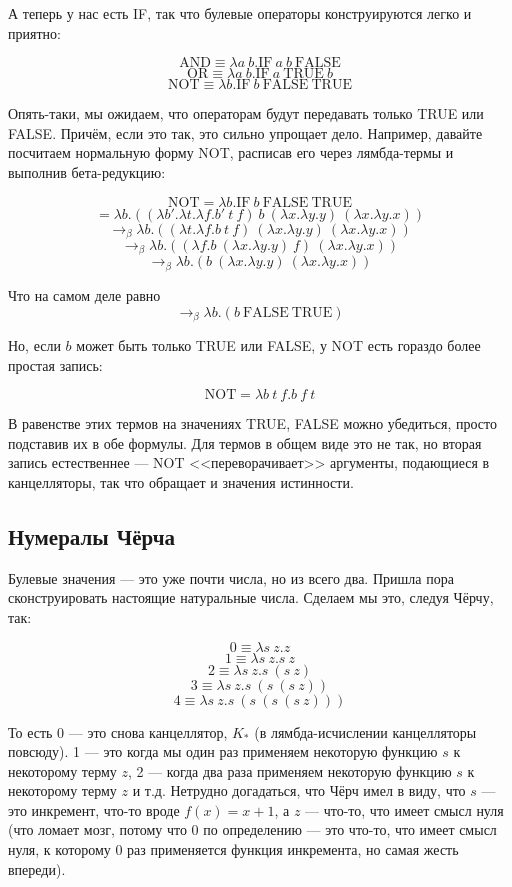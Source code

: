 \documentclass[a5paper]{article}
\begin{document}
А теперь у нас есть IF, так что булевые операторы конструируются легко и приятно:

$$\mbox{AND} \equiv \lambda a\ b. \mbox{IF}\ a\ b\ \mbox{FALSE}$$
$$\mbox{OR} \equiv \lambda a\ b. \mbox{IF}\ a\ \mbox{TRUE}\ b$$
$$\mbox{NOT} \equiv \lambda b.\mbox{IF}\ b\ \mbox{FALSE}\ \mbox{TRUE}$$

Опять-таки, мы ожидаем, что операторам будут передавать только TRUE или FALSE. Причём, если это так, это сильно упрощает дело. Например, давайте посчитаем нормальную форму NOT, расписав его через лямбда-термы и выполнив бета-редукцию:

$$\mbox{NOT} = \lambda b.\mbox{IF}\ b\ \mbox{FALSE}\ \mbox{TRUE}$$
$$= \lambda b.((\lambda b'.\lambda t.\lambda f.b'\ t\ f)\ b\ (\lambda x.\lambda y.y)\ (\lambda x.\lambda y.x))$$
$$\rightarrow_\beta \lambda b.((\lambda t.\lambda f.b\ t\ f)\ (\lambda x.\lambda y.y)\ (\lambda x.\lambda y.x))$$
$$\rightarrow_\beta \lambda b.((\lambda f.b\ (\lambda x.\lambda y.y)\ f)\ (\lambda x.\lambda y.x))$$
$$\rightarrow_\beta \lambda b.(b\ (\lambda x.\lambda y.y)\ (\lambda x.\lambda y.x))$$

Что на самом деле равно
$$\rightarrow_\beta \lambda b.(b\ \mbox{FALSE}\ \mbox{TRUE})$$

Но, если $b$ может быть только TRUE или FALSE, у NOT есть гораздо более простая запись:

$$\mbox{NOT} = \lambda b\ t\ f.b\ f\ t$$

В равенстве этих термов на значениях TRUE, FALSE можно убедиться, просто подставив их в обе формулы. Для термов в общем виде это не так, но вторая запись естественнее --- NOT <<переворачивает>> аргументы, подающиеся в канцелляторы, так что обращает и значения истинности.

\subsection{Нумералы Чёрча}

Булевые значения --- это уже почти числа, но из всего два. Пришла пора сконструировать настоящие натуральные числа. Сделаем мы это, следуя Чёрчу, так:

$$0 \equiv \lambda s\ z.z$$
$$1 \equiv \lambda s\ z.s\ z$$
$$2 \equiv \lambda s\ z.s\ (s\ z)$$
$$3 \equiv \lambda s\ z.s\ (s\ (s\ z))$$
$$4 \equiv \lambda s\ z.s\ (s\ (s\ (s\ z)))$$

То есть 0 --- это снова канцеллятор, $K_\ast$ (в лямбда-исчислении канцелляторы повсюду). 1 --- это когда мы один раз применяем некоторую функцию $s$ к некоторому терму $z$, 2 --- когда два раза применяем некоторую функцию $s$ к некоторому терму $z$ и т.д. Нетрудно догадаться, что Чёрч имел в виду, что $s$ --- это инкремент, что-то вроде $f(x) = x + 1$, а $z$ --- что-то, что имеет смысл нуля (что ломает мозг, потому что 0 по определению --- это что-то, что имеет смысл нуля, к которому 0 раз применяется функция инкремента, но самая жесть впереди).
\end{document}
